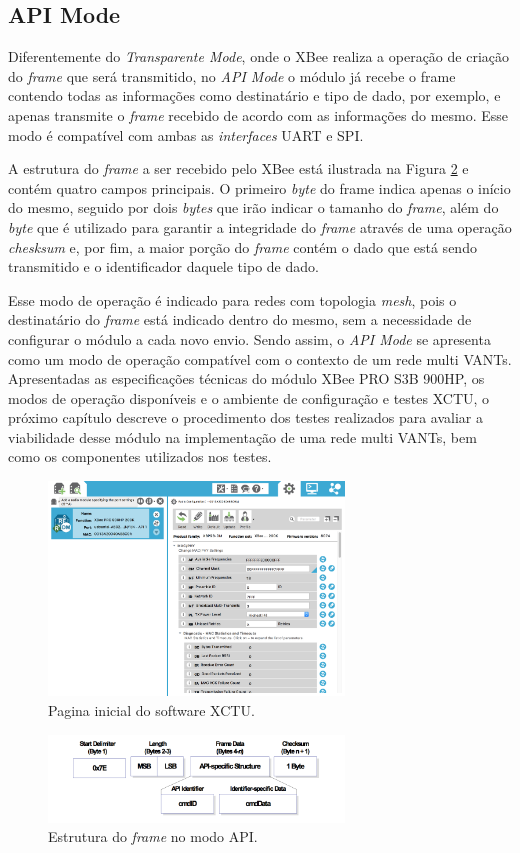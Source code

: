 \subsection{API Mode}

Diferentemente do \emph{Transparente Mode}, onde o XBee realiza a operação de criação do \emph{frame} que será transmitido, no \emph{API Mode} o módulo já recebe o frame contendo todas as informações como destinatário e tipo de dado, por exemplo, e apenas transmite o \emph{frame} recebido de acordo com as informações do mesmo. Esse modo é compatível com ambas as \emph{interfaces} UART e SPI.

A estrutura do \emph{frame} a ser recebido pelo XBee está ilustrada na Figura \ref{fig:apiframe} e contém quatro campos principais. O primeiro \emph{byte} do frame indica apenas o início do mesmo, seguido por dois \emph{bytes} que irão indicar o tamanho do \emph{frame}, além do \emph{byte} que é utilizado para garantir a integridade do \emph{frame} através de uma operação \emph{chesksum} e, por fim, a maior porção do \emph{frame} contém o dado que está sendo transmitido e o identificador daquele tipo de dado.

Esse modo de operação é indicado para redes com topologia \emph{mesh}, pois o destinatário do \emph{frame} está indicado dentro do mesmo, sem a necessidade de configurar o módulo a cada novo envio. Sendo assim, o \emph{API Mode} se apresenta como um modo de operação compatível com o contexto de um rede multi VANTs.\\

Apresentadas as especificações técnicas do módulo XBee PRO S3B 900HP, os modos de operação disponíveis e o ambiente de configuração e testes XCTU, o próximo capítulo descreve o procedimento dos testes realizados para avaliar a viabilidade desse módulo na implementação de uma rede multi VANTs, bem como os componentes utilizados nos testes. 

\begin{figure} 
\center
\includegraphics[width=0.7\textwidth]{xctu.png}
\caption{Pagina inicial do software XCTU.} 
\label{fig:xctu}
\end{figure}

\begin{figure} 
\center
\includegraphics[width=0.7\textwidth]{apiframe.png}
\caption{Estrutura do \emph{frame} no modo API.} 
\label{fig:apiframe}
\end{figure}